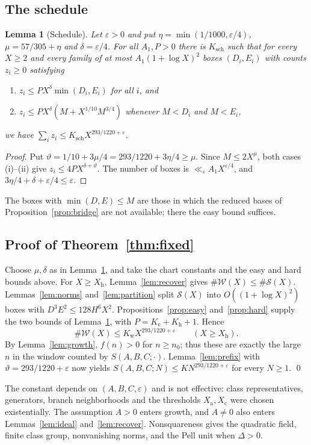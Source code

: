 \documentclass[11pt,reqno]{amsart}
\newtheorem{lemma}[theorem]{Lemma}
\theoremstyle{definition}
\theoremstyle{remark}
\numberwithin{equation}{section}
\newcommand{\eps}{\varepsilon}\newcommand{\card}{\#}
\begin{document}
\subsection{The schedule}
\begin{lemma}[Schedule]\label{lem:schedule}
Let $\eps>0$ and put $\eta=\min(1/1000,\eps/4)$, $\mu=57/305+\eta$ and
$\delta=\eps/4$. For all $A_1,P>0$ there is $K_{\mathrm{sch}}$ such that for every
$X\ge2$ and every family of at most $A_1(1+\log X)^2$ boxes $(D_i,E_i)$ with
counts $z_i\ge0$ satisfying
\begin{enumerate}[label=\textup{(\roman*)}]
\item $z_i\le PX^{\delta}\min(D_i,E_i)$ for all $i$, and
\item $z_i\le PX^{\delta}(M+X^{1/10}M^{3/4})$ whenever $M<D_i$ and
$M<E_i$,
\end{enumerate}
we have $\sum_iz_i\le K_{\mathrm{sch}}X^{293/1220+\eps}$.
\end{lemma}
\begin{proof}
Put $\vartheta=1/10+3\mu/4=293/1220+3\eta/4\ge\mu$.
Since $M\le2X^\mu$, both cases (i)--(ii) give
$z_i\le4PX^{\delta+\vartheta}$.
The number of boxes is $\ll_\eps A_1X^{\eps/4}$, and
$3\eta/4+\delta+\eps/4\le\eps$.
\end{proof}
The boxes with
$\min(D,E)\le M$ are those in which the reduced bases of
Proposition~\ref{prop:bridge} are not available; there the easy bound
suffices.

\subsection{Proof of Theorem~\ref{thm:fixed}}
Choose $\mu,\delta$ as in Lemma~\ref{lem:schedule}, and take the chart
constants and the easy and hard bounds above. For $X\ge X_{\mathrm h}$,
Lemma~\ref{lem:recover} gives $\card\mathcal W(X)\le\card\mathcal S(X)$.
Lemmas~\ref{lem:norms} and~\ref{lem:partition} split $\mathcal S(X)$
into $O((1+\log X)^2)$ boxes with $D^3E^2\le128H^6X^2$.
Propositions~\ref{prop:easy} and~\ref{prop:hard} supply the two bounds
of Lemma~\ref{lem:schedule}, with $P=K_{\mathrm e}+K_{\mathrm h}+1$.
Hence
\[
 \card\mathcal W(X)\le K_{\mathrm w}X^{293/1220+\eps}
 \qquad(X\ge X_{\mathrm h}).
\]
By Lemma~\ref{lem:growth}, $f(n)>0$ for $n\ge n_0$; thus these are
exactly the large $n$ in the window counted by $S(A,B,C;\cdot)$.
Lemma~\ref{lem:prefix} with $\vartheta=293/1220+\eps$ now yields
$S(A,B,C;N)\le KN^{293/1220+\eps}$ for every $N\ge1$. \qed

\medskip
The constant depends on $(A,B,C,\eps)$ and is not effective: class
representatives, generators, branch neighborhoods and the thresholds
$X_{\mathrm a},X_{\mathrm c}$ were chosen existentially.
The assumption $A>0$ enters growth, and $A\ne0$ also enters
Lemmas~\ref{lem:ideal} and~\ref{lem:recover}. Nonsquareness gives the
quadratic field, finite class group, nonvanishing norms, and the Pell
unit when $\Delta>0$.
\end{document}
